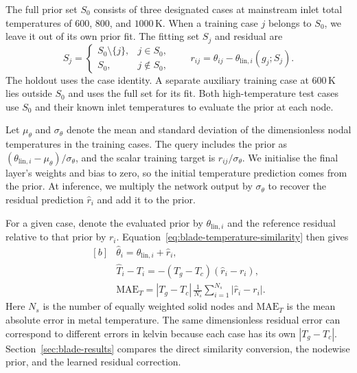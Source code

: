 \documentclass[a4paper,fleqn]{cas-sc}
\begin{document}
The full prior set $S_0$ consists of three designated cases at mainstream inlet total
temperatures of $600$, $800$, and $1000\,\mathrm{K}$. When a training case $j$ belongs
to $S_0$, we leave it out of its own prior fit. The fitting set $S_j$ and residual are
\begin{equation}
  \label{eq:blade-training-residual}
  S_j=
  \begin{cases}
    S_0\setminus\{j\}, & j\in S_0, \\
    S_0, & j\notin S_0 ,
  \end{cases}
  \qquad
  r_{ij}=\theta_{ij}-\theta_{\mathrm{lin},i}(g_j;S_j).
\end{equation}
The holdout uses the case identity. A separate auxiliary training case at
$600\,\mathrm{K}$ lies outside $S_0$ and uses the full set for its fit. Both
high-temperature test cases use $S_0$ and their known inlet temperatures to evaluate
the prior at each node.

Let $\mu_\theta$ and $\sigma_\theta$ denote the mean and standard deviation of the
dimensionless nodal temperatures in the training cases. The query includes the prior
as $(\theta_{\mathrm{lin},i}-\mu_\theta)/\sigma_\theta$, and the scalar training target
is $r_{ij}/\sigma_\theta$. We initialise the final layer's weights and bias to zero,
so the initial temperature prediction comes from the prior. At inference, we multiply
the network output by $\sigma_\theta$ to recover the residual prediction $\widehat r_i$
and add it to the prior.

For a given case, denote the evaluated prior by $\theta_{\mathrm{lin},i}$ and the
reference residual relative to that prior by $r_i$. Equation~\eqref{eq:blade-temperature-similarity}
then gives
\begin{equation}
  \label{eq:blade-temperature-error}
  \begin{aligned}[b]
    &\widehat\theta_i = \theta_{\mathrm{lin},i}+\widehat r_i, \\
    &\widehat T_i-T_i = -(T_g-T_c)(\widehat r_i-r_i), \\
    &\mathrm{MAE}_T =
      |T_g-T_c|\,\frac{1}{N_s}
      \sum_{i=1}^{N_s} |\widehat r_i-r_i|.
  \end{aligned}
\end{equation}
Here $N_s$ is the number of equally weighted solid nodes and $\mathrm{MAE}_T$ is the
mean absolute error in metal temperature. The same dimensionless residual error can
correspond to different errors in kelvin because each case has its own $|T_g-T_c|$.
Section~\ref{sec:blade-results} compares the direct similarity conversion, the nodewise
prior, and the learned residual correction.
\end{document}
